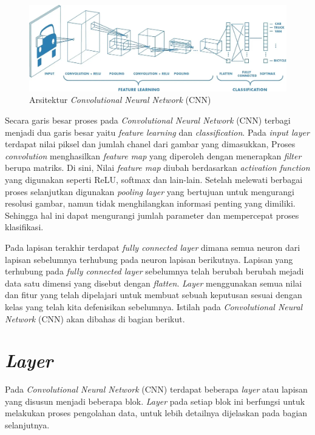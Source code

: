   \begin{figure}[H]
      \centering
      \includegraphics[width=1\textwidth]{figures/bab2/arsitektur cnn.jpg}
      \caption{Arsitektur \textit{Convolutional Neural Network} (CNN) \cite{Prabhu}}
      \label{Arsitektur CNN}
    
    \end{figure}

    Secara garis besar proses pada \textit{Convolutional Neural Network} (CNN) terbagi menjadi dua garis besar yaitu \textit{feature learning} dan \textit{classification}. Pada \textit{input layer} terdapat nilai piksel dan jumlah chanel dari gambar yang dimasukkan, Proses \textit{convolution} menghasilkan \textit{feature map} 
    yang diperoleh dengan menerapkan \textit{filter} berupa matriks.  Di sini, Nilai \textit{feature map} diubah berdasarkan \textit{activation function} yang digunakan seperti ReLU, softmax dan lain-lain. Setelah melewati berbagai proses selanjutkan digunakan \textit{pooling layer} yang bertujuan untuk mengurangi resolusi gambar, namun tidak menghilangkan informasi penting yang dimiliki. Sehingga hal ini dapat mengurangi jumlah parameter dan mempercepat proses klasifikasi. 

    Pada lapisan terakhir terdapat \textit{fully connected layer} dimana semua neuron dari lapisan sebelumnya terhubung 
    pada neuron lapisan berikutnya. Lapisan yang terhubung pada \textit{fully connected layer} sebelumnya telah berubah 
    berubah mejadi data satu dimensi yang disebut dengan \textit{flatten}. \textit{Layer}
    menggunakan semua nilai dan fitur yang telah dipelajari untuk membuat sebuah keputusan sesuai dengan kelas yang telah 
    kita defenisikan sebelumnya. Istilah pada \textit{Convolutional Neural Network} (CNN) akan dibahas di bagian berikut. 


\section{\textit{Layer}}

Pada \textit{Convolutional Neural Network} (CNN) terdapat beberapa \textit{layer} atau lapisan yang disusun 
menjadi beberapa blok. \textit{Layer} pada setiap blok ini berfungsi untuk melakukan proses pengolahan data, 
untuk lebih detailnya dijelaskan pada bagian selanjutnya.


